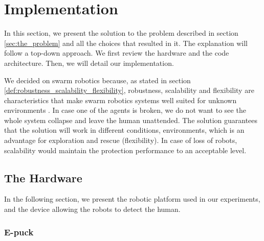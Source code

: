 \documentclass[oneside, a4paper, 12pt]{memoir}
\begin{document}
\section{Implementation}

	In this section, we present the solution to the problem described in section \ref{sec:the_problem} and all the choices that resulted in it. The explanation will follow a top-down approach. We first review the hardware and the code architecture. Then, we will detail our implementation.
	
	We decided on swarm robotics because, as stated in section \ref{def:robustness_scalability_flexibility}, robustness, scalability and flexibility are characteristics that make swarm robotics systems well suited for unknown environments \citep{brambilla2013swarm}. In case one of the agents is broken, we do not want to see the whole system collapse and leave the human unattended. The solution guarantees that the solution will work in different conditions, environments, which is an advantage for exploration and rescue (flexibility). In case of loss of robots, scalability would maintain the protection performance to an acceptable level.
	
	\subsection{The Hardware}
	
	In the following section, we present the robotic platform used in our experiments, and the device allowing the robots to detect the human.
	
		\subsubsection{E-puck}
		\label{sec:e-puck}
		
\end{document}

